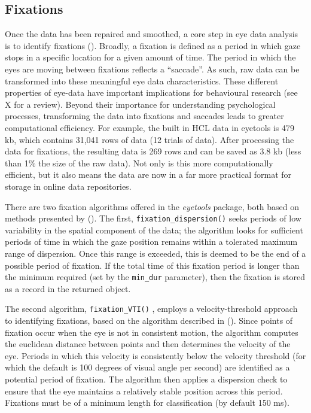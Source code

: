 \documentclass[
  man,
  floatsintext,
  longtable,
  nolmodern,
  notxfonts,
  notimes,
  colorlinks=true,linkcolor=blue,citecolor=blue,urlcolor=blue]{apa7}
\begin{document}
\subsection{Fixations}\label{fixations}

Once the data has been repaired and smoothed, a core step in eye data
analysis is to identify fixations (). Broadly, a fixation is defined as a period in which
gaze stops in a specific location for a given amount of time. The period
in which the eyes are moving between fixations reflects a ``saccade''.
As such, raw data can be transformed into these meaningful eye data
characteristics. These different properties of eye-data have important
implications for behavioural research (see X for a review). Beyond their
importance for understanding psychological processes, transforming the
data into fixations and saccades leads to greater computational
efficiency. For example, the built in HCL data in eyetools is 479 kb,
which contains 31,041 rows of data (12 trials of data). After processing
the data for fixations, the resulting data is 269 rows and can be saved
as 3.8 kb (less than 1\% the size of the raw data). Not only is this
more computationally efficient, but it also means the data are now in a
far more practical format for storage in online data repositories.

There are two fixation algorithms offered in the \emph{eyetools}
package, both based on methods presented by
(). The first,
\texttt{fixation\_dispersion()} seeks periods of low variability in the
spatial component of the data; the algorithm looks for sufficient
periods of time in which the gaze position remains within a tolerated
maximum range of dispersion. Once this range is exceeded, this is deemed
to be the end of a possible period of fixation. If the total time of
this fixation period is longer than the minimum required (set by the
\texttt{min\_dur} parameter), then the fixation is stored as a record in
the returned object.

The second algorithm, \texttt{fixation\_VTI()} , employs a
velocity-threshold approach to identifying fixations, based on the
algorithm described in (). Since points of fixation occur when the eye is not in
consistent motion, the algorithm computes the euclidean distance between
points and then determines the velocity of the eye. Periods in which
this velocity is consistently below the velocity threshold (for which
the default is 100 degrees of visual angle per second) are identified as
a potential period of fixation. The algorithm then applies a dispersion
check to ensure that the eye maintains a relatively stable position
across this period. Fixations must be of a minimum length for
classification (by default 150 ms).
\end{document}

